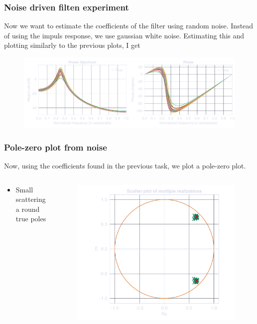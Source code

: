 \documentclass[compress,aspectratio=169]{beamer}
\begin{document}
\begin{frame} %
    \frametitle{Noise driven filten experiment}
    Now we want to estimate the coefficients of the filter using random noise.
    Instead of using the impuls response, we use gaussian white noise.
    Estimating this and plotting similarly to the previous plots, I get
    \begin{figure}
        \includegraphics[width=\columnwidth]{"../7.pdf"}
    \end{figure}
\end{frame} %

\begin{frame} %
    \frametitle{Pole-zero plot from noise}
    Now, using the coefficients found in the previous task, we plot a pole-zero
    plot.
    \begin{columns}
        \begin{column}{0.5\textwidth}
            \begin{itemize}
                \item Small scattering a round true poles
            \end{itemize}
        \end{column}
        \begin{column}{0.5\textwidth}
            \begin{figure}
                \includegraphics[width=\columnwidth]{"../8.pdf"}
            \end{figure}
        \end{column}
    \end{columns}
\end{frame} %
\end{document}
